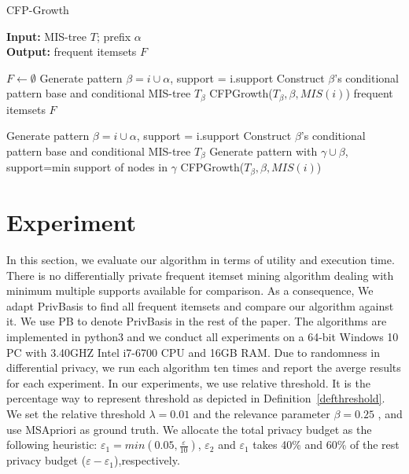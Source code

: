 \documentclass[conference]{IEEEtran}
\begin{document}
\begin{algorithm}[htbp]
    \caption{CFP-Growth}
    \hspace*{0.02in} {\bf Input:} %
    MIS-tree $T$; prefix $\alpha$\\
    \hspace*{0.02in} {\bf Output:} %
    frequent itemsets $F$
    \begin{algorithmic}[1]
        \State $F\leftarrow \emptyset$
        \State Generate pattern $\beta=i\cup\alpha$, support = i.support
        \State Construct $\beta$'s conditional pattern base and 
        \State conditional MIS-tree $T_\beta$
        \State CFPGrowth($T_\beta,\beta,MIS(i)$)
        \EndIf
        \EndFor
    \State \Return frequent itemsets $F$
    
    \State Generate pattern $\beta=i\cup\alpha$, support = i.support
    \State Construct $\beta$'s conditional pattern base and 
    \State conditional MIS-tree $T_\beta$
    \State Generate pattern with $\gamma \cup \beta$,
    \State support=min support of nodes in $\gamma$
    \EndFor
    \Else
    \State CFPGrowth($T_\beta,\beta,MIS(i)$)
    \EndIf
    \EndIf
    \EndFor
    \EndFunction
    \end{algorithmic} 
    \label{alg5}
\end{algorithm}


\section{Experiment}\label{sec5}
In this section, we evaluate our algorithm in terms of utility and execution time. 
There is no differentially private frequent itemset mining algorithm dealing with minimum multiple supports available for comparison.
As a consequence, We adapt PrivBasis\cite{b7} to find all frequent itemsets and compare our algorithm against it.
We use PB to denote PrivBasis in the rest of the paper.
The algorithms are implemented in python3 and we conduct all experiments on a 64-bit Windows 10 PC with 3.40GHZ Intel i7-6700 CPU and 16GB RAM.
Due to randomness in differential privacy, we run each algorithm ten times and report the averge results for each experiment.
In our experiments, we use relative threshold. It is the percentage way to represent threshold as depicted in Definition~\ref{defthreshold}.
We set the relative threshold $\lambda=0.01$ and the relevance parameter $\beta=0.25$ , and use MSApriori\cite{b2} as ground truth.
We allocate the total privacy budget as the following heuristic: 
$\varepsilon_1=min(0.05,\frac{\varepsilon}{10})$, $\varepsilon_2$ and $\varepsilon_1$ takes 40\% and 60\% of the rest privacy budget ($\varepsilon-\varepsilon_1$),respectively.
\end{document}
